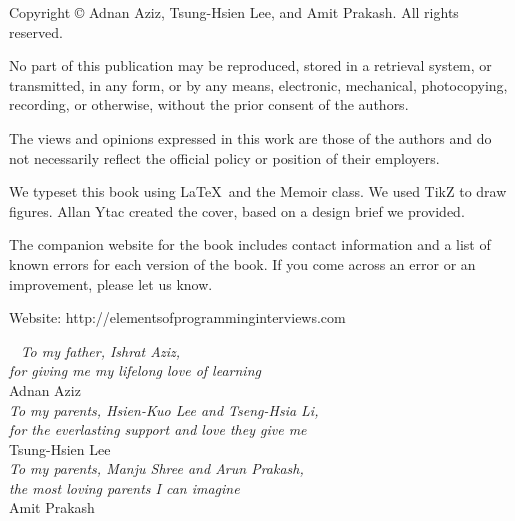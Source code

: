 \documentclass[10pt,openany,twoside,letterpaper,extrafontsizes]{memoir}
\newcommand{\vs}{%
\vspace{2mm}%
\noindent%
}
\begin{document}
\vs
\noindent
Copyright \copyright{ }\the\year{ }Adnan Aziz, Tsung-Hsien Lee, and Amit Prakash.  All rights reserved.

\vs
\noindent
No part of this publication may be reproduced, stored in a retrieval system, or transmitted, in any form, or by any means, electronic, mechanical, photocopying, recording, or otherwise, without the prior consent of the authors.

\vs
\noindent
The views and opinions expressed in this work are those of the authors and do not necessarily reflect the official policy or position of their employers.

\vs
\noindent
We typeset this book using \LaTeX~and the Memoir class. We used TikZ to draw figures.
Allan Ytac created the cover, based on a design brief we provided.

\vs
\noindent
The companion website for the book includes contact information and a list of known errors for each version of the book.
If you come across an error or an improvement, please let us know.

%
\vs
\noindent Website: \textsf{http://elementsofprogramminginterviews.com}



\clearpage

\thispagestyle{empty}
\begin{center}
\Large
\mbox{ }
\vfill
{\em To my father, Ishrat Aziz, \\ for giving me my lifelong love of learning}\\
\vspace{0.3in}
Adnan Aziz \\
\vfill
{\em To my parents, Hsien-Kuo Lee and Tseng-Hsia Li, \\ for the everlasting support and love they give me} \\
\vspace{0.3in}
Tsung-Hsien Lee \\
\vfill
{\em To my parents, Manju Shree and Arun Prakash, \\ the most loving parents I can imagine} \\
\vspace{0.3in}
Amit Prakash \\
\vfill
\end{center}
\end{document}
